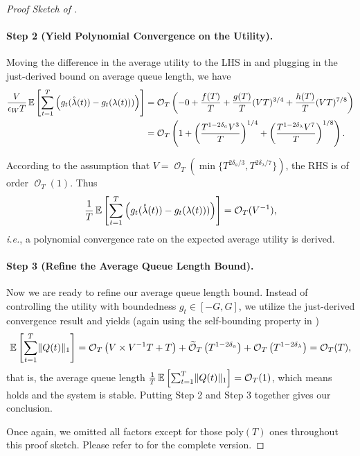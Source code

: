\documentclass[11pt,fullpage,letterpaper]{article} %
\renewcommand{\bm}[1]{#1}%
\renewcommand{\tilde}{\widetilde}
\renewcommand{\O}{\operatorname{\mathcal O}}
\newcommand{\Otil}{\operatorname{\tilde{\mathcal O}}}
\newcommand{\E}{\operatornamewithlimits{\mathbb{E}}}
\begin{document}
\begin{proof}[Proof Sketch of ]
\paragraph{Step 2 (Yield Polynomial Convergence on the Utility).}
Moving the difference in the average utility to the LHS in  and plugging in the just-derived bound on average queue length, we have
\begin{align*}
\frac{V}{\epsilon_W T} \E\left [\sum_{t=1}^T \left (g_t(\mathring{\bm \lambda}(t)) - g_t(\bm \lambda(t)))\right )\right ]&=\O_T\left (-0+\frac{f(T)}{T}+\frac{g(T)}{T}(VT)^{3/4}+\frac{h(T)}{T}(VT)^{7/8}\right )\\
&=\O_T\left (1+\left (\frac{T^{1-2\delta_a}V^3}{T}\right )^{1/4}+\left (\frac{T^{1-2\delta_\lambda}V^7}{T}\right )^{1/8}\right ).
\end{align*}

According to the assumption that $V=\O_T(\min\{T^{2\delta_a/3},T^{2\delta_\lambda/7}\})$, the RHS is of order $\O_T(1)$. Thus
\begin{equation*}
\frac 1T \E\left [\sum_{t=1}^T \left (g_t(\mathring{\bm \lambda}(t)) - g_t(\bm \lambda(t)))\right )\right ]=\O_T(V^{-1}),
\end{equation*}
\textit{i.e.}, a polynomial convergence rate on the expected average utility is derived.

\paragraph{Step 3 (Refine the Average Queue Length Bound).}
Now we are ready to refine our average queue length bound. Instead of controlling the utility with boundedness $g_t\in [-G,G]$, we utilize the just-derived convergence result and yields (again using the self-bounding property in )
\begin{equation*}
\E\left [\sum_{t=1}^T \lVert \bm Q(t)\rVert_1\right ]=\O_T\left (V \times V^{-1} T + T\right ) + \Otil_T\left (T^{1-2\delta_a}\right ) + \O_T\left (T^{1-2\delta_\lambda}\right )=\O_T(T),
\end{equation*}
that is, the average queue length $\frac 1T\E\left [\sum_{t=1}^T \lVert \bm Q(t)\rVert_1\right ]=\O_T(1)$, which means  holds and the system is stable. Putting Step 2 and Step 3 together gives our conclusion.

Once again, we omitted all factors except for those $\text{poly}(T)$ ones throughout this proof sketch. Please refer to  for the complete version.
\end{proof}
\end{document}
